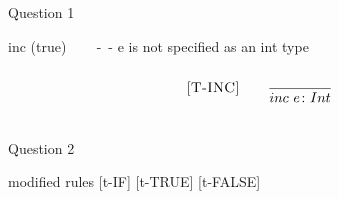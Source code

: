 \documentclass[addpoinT]{exam}
\begin{document}
\newcommand{\mydefhead}[2]{\multicolumn{2}{l}{{#1}}&\mbox{\emph{#2}}\\}
\newcommand{\mydefcase}[2]{\qquad\qquad\qquad\qquad\qquad\qquad& #1 &\mbox{#2}\\}

\newcommand{\setexp}[2]{\mbox{\tt set}~#1~#2}
\newcommand{\readexp}[1]{\mbox{\tt read}~#1}
\newcommand{\loopexp}[2]{\mbox{\tt loop}~#1~#2}
\newcommand{\incexp}[1]{\mbox{\tt inc}~{#1}}
\newcommand{\testexp}[2]{\mbox{\tt test}~{#1}~{#2}}
\newcommand{\thenexp}[2]{#1~\mbox{\tt then}~{#2}}
\newcommand{\crashexp}{\mbox{\tt crash}}
\newcommand{\rel}[1]{ \mbox{\sc [#1]} }
\newcommand{\sstep}[2]{{#1} \rightarrow {#2}}
\newcommand{\bstep}[2]{{#1} \Downarrow {#2}}
\newcommand{\Ttep}[2]{{#1} \colon {#2}}

\newcommand{\ssrule}[3]{
  \rel{#1} &
  \frac{\strut\begin{array}{@{}c@{}} #2 \end{array}}
       {\strut\begin{array}{@{}c@{}} #3 \end{array}}
   \\~\\
}

\newcommand{\Esucc}[1]{\mbox{\tt succ}~#1}
\newcommand{\Epred}[1]{\mbox{\tt pred}~#1}
\newcommand{\Eiszero}[1]{\mbox{\tt iszero}~#1}
\newcommand{\Econcat}[2]{\mbox{\tt concat}~{#1}~{#2}}
\newcommand{\Eisstring}[1]{\mbox{\tt isstring}~#1}
\newcommand{\Eisint}[1]{\mbox{\tt isint}~#1}
\newcommand{\Eisbool}[1]{\mbox{\tt isbool}~#1}
\newcommand{\ife}[3]{\mbox{\tt if}~{#1}~\mbox{\tt then}~{#2}~\mbox{\tt else}~{#3}}
\newcommand{\true}{\mbox{\tt true}}
\newcommand{\false}{\mbox{\tt false}}

Question 1

inc (true) ~~~ -~- e is not specified as an int type

\[
  \begin{array}{r@{\qquad}c}
    \ssrule{T-INC}{
    }{
        \Ttep{inc~e}{Int}
    }
  \end{array}
\]

Question 2 

modified rules [t-IF] [t-TRUE] [t-FALSE]
\end{document}

